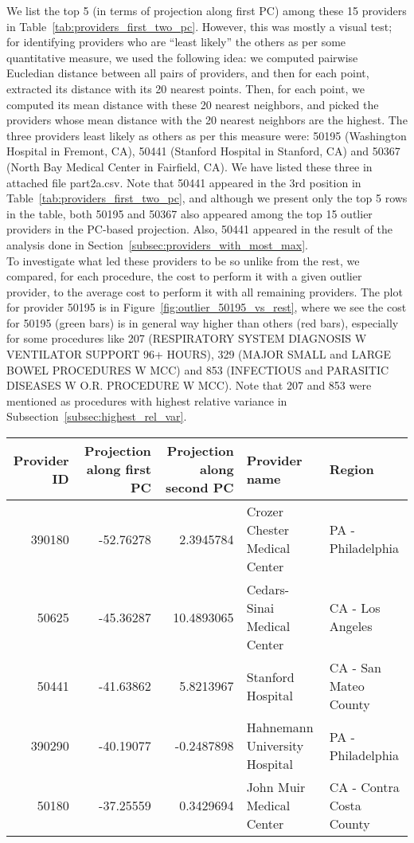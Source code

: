 We list the top 5 (in terms of projection along first PC) among these 15 providers in Table~\ref{tab:providers_first_two_pc}. However, this was mostly a visual test; for identifying providers who are ``least likely'' the others as per some quantitative measure, we used the following idea: we computed pairwise Eucledian distance between all pairs of providers, and then for each point, extracted its distance with its 20 nearest points. Then, for each point, we computed its mean distance with these 20 nearest neighbors, and picked the providers whose mean distance with the 20 nearest neighbors are the highest. The three providers least likely as others as per this measure were: 50195 (Washington Hospital in Fremont, CA), 50441 (Stanford Hospital in Stanford, CA) and 50367 (North Bay Medical Center in Fairfield, CA). We have listed these three in attached file part2a.csv. Note that 50441 appeared in the 3rd position in Table~\ref{tab:providers_first_two_pc}, and although we present only the top 5 rows in the table, both 50195 and 50367 also appeared among the top 15 outlier providers in the PC-based projection. Also, 50441 appeared in the result of the analysis done in Section~\ref{subsec:providers_with_most_max}.\\

To investigate what led these providers to be so unlike from the rest, we compared, for each procedure, the cost to perform it with a given outlier provider, to the average cost to perform it with all remaining providers. The plot for provider 50195 is in Figure~\ref{fig:outlier_50195_vs_rest}, where we see the cost for 50195 (green bars) is in general way higher than others (red bars), especially for some procedures like 207 (RESPIRATORY SYSTEM DIAGNOSIS W VENTILATOR SUPPORT 96+ HOURS), 329 (MAJOR SMALL and LARGE BOWEL PROCEDURES W MCC) and 853 (INFECTIOUS and PARASITIC DISEASES W O.R. PROCEDURE W MCC). Note that 207 and 853 were mentioned as procedures with highest relative variance in Subsection~\ref{subsec:highest_rel_var}.

\begin{table*}[!h]
\centering
\caption{Outlier providers based on projection on first two PCs}
\begin{tabular}{rrrll}
\hline
Provider ID & Projection along first PC & Projection along second PC  & Provider name & Region\\
\hline
390180 & -52.76278 & 2.3945784 & Crozer Chester Medical Center & PA - Philadelphia\\
50625 & -45.36287 & 10.4893065 & Cedars-Sinai Medical Center & CA - Los Angeles\\
50441 & -41.63862 & 5.8213967 & Stanford Hospital & CA - San Mateo County\\
390290 & -40.19077 & -0.2487898 & Hahnemann University Hospital & PA - Philadelphia\\
50180 & -37.25559 & 0.3429694 & John Muir Medical Center & CA - Contra Costa County\\
\hline
\end{tabular}
\label{tab:providers_first_two_pc}
\end{table*}


